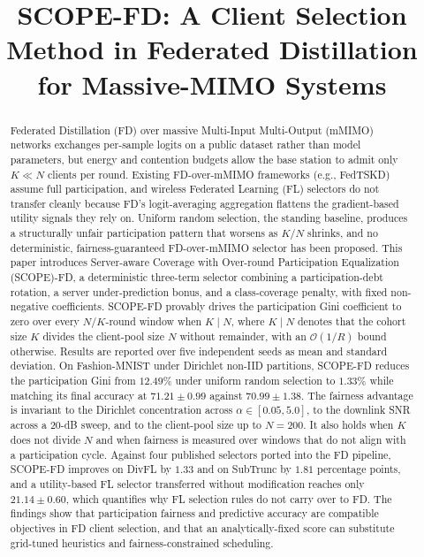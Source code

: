 \documentclass[journal]{IEEEtran}
\newcommand{\revIVE}[1]{#1}
\newcommand{\rev}[1]{#1}
\begin{document}
\title{SCOPE-FD: A Client Selection Method in Federated Distillation for Massive-MIMO Systems}

\author{
}

\maketitle

\begin{abstract}
\revIVE{Federated Distillation (FD) over massive Multi-Input Multi-Output (mMIMO) networks exchanges per-sample logits on a public dataset rather than model parameters, but energy and contention budgets allow the base station to admit only $K \ll N$ clients per round. Existing FD-over-mMIMO frameworks (e.g., FedTSKD) assume full participation, and wireless Federated Learning (FL) selectors do not transfer cleanly because FD's logit-averaging aggregation flattens the gradient-based utility signals they rely on. Uniform random selection, the standing baseline, produces a structurally unfair participation pattern that worsens as $K/N$ shrinks, and no deterministic, fairness-guaranteed FD-over-mMIMO selector has been proposed. This paper introduces Server-aware Coverage with Over-round Participation Equalization (SCOPE)-FD, a deterministic three-term selector combining a participation-debt rotation, a server under-prediction bonus, and a class-coverage penalty, with fixed non-negative coefficients. SCOPE-FD provably drives the participation Gini coefficient to zero over every $N/K$-round window when $K \mid N$, where $K \mid N$ denotes that the cohort size $K$ divides the client-pool size $N$ without remainder, with an $\mathcal{O}(1/R)$ bound otherwise. \rev{Results are reported over five independent seeds as mean and standard deviation. On Fashion-MNIST under Dirichlet non-IID partitions, SCOPE-FD reduces the participation Gini from $12.49\%$ under uniform random selection to $1.33\%$ while matching its final accuracy at $71.21 \pm 0.99$ against $70.99 \pm 1.38$. The fairness advantage is invariant to the Dirichlet concentration across $\alpha \in [0.05, 5.0]$, to the downlink SNR across a $20$-dB sweep, and to the client-pool size up to $N = 200$. It also holds when $K$ does not divide $N$ and when fairness is measured over windows that do not align with a participation cycle. Against four published selectors ported into the FD pipeline, SCOPE-FD improves on DivFL by $1.33$ and on SubTrunc by $1.81$ percentage points, and a utility-based FL selector transferred without modification reaches only $21.14 \pm 0.60$, which quantifies why FL selection rules do not carry over to FD.} The findings show that participation fairness and predictive accuracy are compatible objectives in FD client selection, and that an analytically-fixed score can substitute grid-tuned heuristics and fairness-constrained scheduling. }

\end{abstract}
\end{document}
